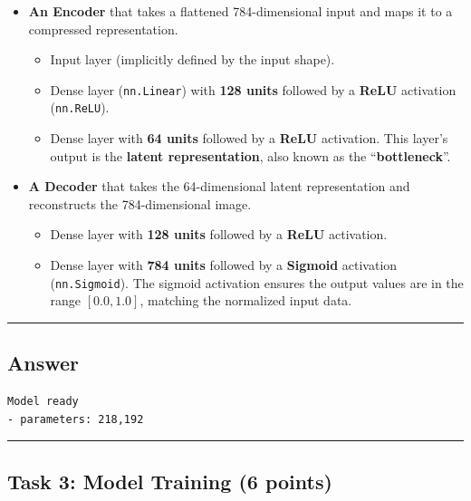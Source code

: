 \documentclass[
  letterpaper,
  DIV=11,
  numbers=noendperiod]{scrartcl}
\providecommand{\tightlist}{%
  \setlength{\itemsep}{0pt}\setlength{\parskip}{0pt}}\usepackage{longtable,booktabs,array}
\begin{document}
\begin{itemize}
\item
  \textbf{An Encoder} that takes a flattened 784-dimensional input and
  maps it to a compressed representation.

  \begin{itemize}
  \tightlist
  \item
    Input layer (implicitly defined by the input shape).
  \item
    Dense layer (\texttt{nn.Linear}) with \textbf{128 units} followed by
    a \textbf{ReLU} activation (\texttt{nn.ReLU}).
  \item
    Dense layer with \textbf{64 units} followed by a \textbf{ReLU}
    activation. This layer's output is the \textbf{latent
    representation}, also known as the ``\textbf{bottleneck}''.
  \end{itemize}
\item
  \textbf{A Decoder} that takes the 64-dimensional latent representation
  and reconstructs the 784-dimensional image.

  \begin{itemize}
  \tightlist
  \item
    Dense layer with \textbf{128 units} followed by a \textbf{ReLU}
    activation.
  \item
    Dense layer with \textbf{784 units} followed by a \textbf{Sigmoid}
    activation (\texttt{nn.Sigmoid}). The sigmoid activation ensures the
    output values are in the range \([0.0, 1.0]\), matching the
    normalized input data.
  \end{itemize}
\end{itemize}

\begin{center}\rule{0.5\linewidth}{0.5pt}\end{center}

\subsection{Answer}\label{answer-4}

\label{task2}
\begin{verbatim}
Model ready
- parameters: 218,192
\end{verbatim}

\begin{center}\rule{0.5\linewidth}{0.5pt}\end{center}

\subsection{Task 3: Model Training (6
points)}\label{task-3-model-training-6-points}
\end{document}
